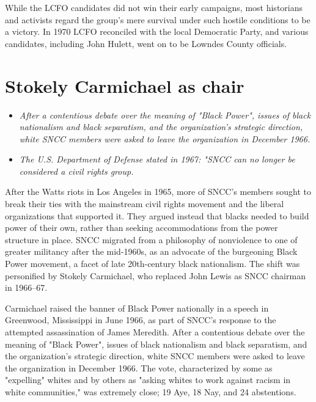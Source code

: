 While the LCFO candidates did not win their early campaigns, most
historians and activists regard the group's mere survival under such
hostile conditions to be a victory. In 1970 LCFO reconciled with the
local Democratic Party, and various candidates, including John Hulett,
went on to be Lowndes County officials.

\section{Stokely Carmichael as chair}\label{stokely-carmichael-as-chair}

\begin{itemize}
\item
  \emph{After a contentious debate over the meaning of "Black Power",
  issues of black nationalism and black separatism, and the
  organization's strategic direction, white SNCC members were asked to
  leave the organization in December 1966.}
\item
  \emph{The U.S. Department of Defense stated in 1967: "SNCC can no
  longer be considered a civil rights group.}
\end{itemize}

After the Watts riots in Los Angeles in 1965, more of SNCC's members
sought to break their ties with the mainstream civil rights movement and
the liberal organizations that supported it. They argued instead that
blacks needed to build power of their own, rather than seeking
accommodations from the power structure in place. SNCC migrated from a
philosophy of nonviolence to one of greater militancy after the
mid-1960s, as an advocate of the burgeoning Black Power movement, a
facet of late 20th-century black nationalism. The shift was personified
by Stokely Carmichael, who replaced John Lewis as SNCC chairman in
1966--67.

Carmichael raised the banner of Black Power nationally in a speech in
Greenwood, Mississippi in June 1966, as part of SNCC's response to the
attempted assassination of James Meredith. After a contentious debate
over the meaning of "Black Power", issues of black nationalism and black
separatism, and the organization's strategic direction, white SNCC
members were asked to leave the organization in December 1966. The vote,
characterized by some as "expelling" whites and by others as "asking
whites to work against racism in white communities," was extremely
close; 19 Aye, 18 Nay, and 24 abstentions.

